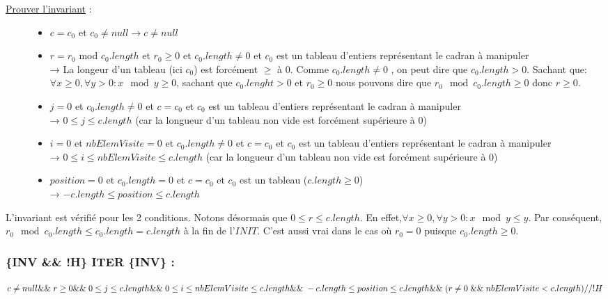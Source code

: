 	
	\begin{description}
		\item[\underline{Prouver l’invariant} :] \hspace{2pt}
		\begin{itemize}
			\item $ c=c_0$ et $c_0 \neq null → c \neq null $
			\item $ r=r_0$ mod $c_0.length$ et $r_0 \geq 0$ et $c_0.length \neq 0$ et $c_0$ est un tableau d’entiers représentant le cadran à manipuler\\
			→ La longeur d’un tableau (ici $c_0$) est forcément $\geq$ à 0. Comme $c_0.length \neq 0$
			, on peut dire que $c_0.length > 0$. Sachant que: $\forall x \geq 0, \forall y > 0: x \mod{y} \geq 0$, sachant que $c_0.lenght > 0$ et $r_0 \geq 0$ nous pouvons dire que $r_0 \mod{c_0.length} \geq 0$ donc $r \geq 0$.
			\item $j=0$ et $c_0.length \neq 0$ et $c=c_0$ et $c_0$ est un tableau d’entiers représentant le cadran à manipuler\\
			→ $0 \leq j \leq c.length$  (car la longueur d’un tableau non vide est forcément supérieure à 0)
			\item $i=0$ et $nbElemVisite=0$ et $c_0.length \neq 0$ et $c=c_0$ et $c_0$ est un tableau d’entiers représentant le cadran à manipuler\\
			→ $0 \leq i \leq nbElemVisite \leq c.length$  (car la longueur d’un tableau non vide est forcément supérieure à $0$)
			\item $position = 0$ et $c_0.length = 0$ et $c=c_0$  et $c_0$ est un tableau ($c.length \geq 0$)\\
			→  $-c.length \leq position \leq c.length$
		\end{itemize}
	\end{description}	
	
	
	L’invariant est vérifié pour les 2 conditions.
	Notons désormais que $0 \leq r \leq c.length$. En effet,$\forall x \geq 0, \forall y > 0 : x \mod{y} \leq y $. Par conséquent,$ r_0 \mod{c_0.length} \leq c_0.length=c.length$ à la fin de l’$INIT$. C’est aussi vrai dans le cas où $r_0=0$ puisque $c_0.length \geq 0$.
	
	
	
	\subsubsection{\{INV \&\& !H\} ITER \{INV\} :}	
	
	$c \neq null\\ 
	\&\&\; r \geq 0\\
	\&\&\; 0 \leq j \leq c.length\\
	\&\&\; 0 \leq i \leq nbElemVisite \leq c.length\\
	\&\&\; -c.length \leq position \leq c.length\\
	\&\&\; (r \neq 0 \;\&\&\; nbElemVisite < c.length)       //!H$
	
